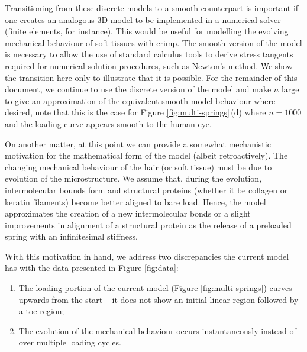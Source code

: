 \documentclass{article}
\begin{document}
Transitioning from these discrete models to a smooth counterpart is important if one creates an analogous 3D model to be implemented in a numerical solver (finite elements, for instance). This would be useful for modelling the evolving mechanical behaviour of soft tissues with crimp. The smooth version of the model is necessary to allow the use of standard calculus tools to derive stress tangents required for numerical solution procedures, such as Newton's method. We show the transition here only to illustrate that it is possible. For the remainder of this document, we continue to use the discrete version of the model and make $n$ large to give an approximation of the equivalent smooth model behaviour where desired, note that this is the case for Figure \ref{fig:multi-springs}\,(d) where $n=1000$ and the loading curve appears smooth to the human eye. 

On another matter, at this point we can provide a somewhat mechanistic motivation for the mathematical form of the model (albeit retroactively). The changing mechanical behaviour of the hair (or soft tissue) must be due to evolution of the microstructure. We assume that, during the evolution, intermolecular bounds form and structural proteins (whether it be collagen or keratin filaments)  become better aligned to bare load. Hence, the model approximates the creation of a new intermolecular bonds or a slight improvements in alignment of a structural protein as the release of a preloaded spring with an infinitesimal stiffness. 

With this motivation in hand, we address two discrepancies the current model has with the data presented in Figure \ref{fig:data}:
\begin{enumerate}
	\item The loading portion of the current model (Figure \ref{fig:multi-springs}) curves upwards from the start --  it does not show an initial linear region followed by a toe region;
	\item The evolution of the mechanical behaviour occurs instantaneously instead of over multiple loading cycles.
\end{enumerate}
\end{document}
